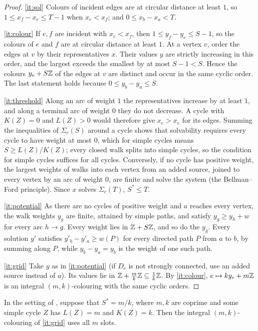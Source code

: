 \documentclass[11pt,colorlinks]{charlie}
\begin{document}
\begin{proof}
\ref{it:sol} Colours of incident edges are at circular distance at least $1$, so $1\le x_f-x_e\le T-1$ when $x_e<x_f$; and $0\le x_b-x_a<T$.

\ref{it:colour} If $e,f$ are incident with $x_e<x_f$, then $1\le y_f-y_e\le S-1$, so the colours of $e$ and $f$ are at circular distance at least $1$. At a vertex $v$, order the edges at $v$ by their representatives $x$. Their values $y$ are strictly increasing in this order, and the largest exceeds the smallest by at most $S-1<S$. Hence the colours $y_e+S\mathbb{Z}$ of the edges at $v$ are distinct and occur in the same cyclic order. The last statement holds because $0\le y_b-y_a\le S$.

\ref{it:threshold} Along an arc of weight $1$ the representatives increase by at least $1$, and along a terminal arc of weight $0$ they do not decrease. A cycle with $K(Z)=0$ and $L(Z)>0$ would therefore give $x_e>x_e$ for its edges. Summing the inequalities of $\Sigma_c(S)$ around a cycle shows that solvability requires every cycle to have weight at most $0$, which for simple cycles means $S\ge L(Z)/K(Z)$; every closed walk splits into simple cycles, so the condition for simple cycles suffices for all cycles. Conversely, if no cycle has positive weight, the largest weights of walks into each vertex from an added source, joined to every vertex by an arc of weight $0$, are finite and solve the system (the Bellman--Ford principle). Since $x$ solves $\Sigma_c(T)$, $S^*\le T$.

\ref{it:potential} As there are no cycles of positive weight and $a$ reaches every vertex, the walk weights $y_g$ are finite, attained by simple paths, and satisfy $y_g\ge y_h+w$ for every arc $h\to g$. Every weight lies in $\mathbb{Z}+S\mathbb{Z}$, and so do the $y_g$. Every solution $y'$ satisfies $y'_b-y'_a\ge w(P)$ for every directed path $P$ from $a$ to $b$, by summing along $P$, while $y_b-y_a=y_b$ is the weight of one such path.

\ref{it:grid} Take $y$ as in \ref{it:potential} (if $D_c$ is not strongly connected, use an added source instead of $a$). Its values lie in $\mathbb{Z}+\frac mk\mathbb{Z}\subseteq\frac1k\mathbb{Z}$. By \ref{it:colour}, $e\mapsto ky_e+m\mathbb{Z}$ is an integral $(m,k)$-colouring with the same cyclic orders.
\end{proof}

\begin{lemma}\label{lem:tight}
In the setting of , suppose that $S^*=m/k$, where $m,k$ are coprime and some simple cycle $Z$ has $L(Z)=m$ and $K(Z)=k$. Then the integral $(m,k)$-colouring of \ref{it:grid} uses all $m$ slots.
\end{lemma}
\end{document}
